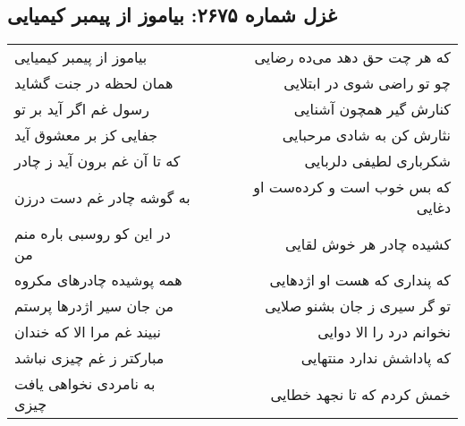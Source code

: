 \begin{center}
\section*{غزل شماره ۲۶۷۵: بیاموز از پیمبر کیمیایی}
\label{sec:2675}
\begin{longtable}{l p{0.5cm} r}
بیاموز از پیمبر کیمیایی
&&
که هر چت حق دهد می‌ده رضایی
\\
همان لحظه در جنت گشاید
&&
چو تو راضی شوی در ابتلایی
\\
رسول غم اگر آید بر تو
&&
کنارش گیر همچون آشنایی
\\
جفایی کز بر معشوق آید
&&
نثارش کن به شادی مرحبایی
\\
که تا آن غم برون آید ز چادر
&&
شکرباری لطیفی دلربایی
\\
به گوشه چادر غم دست درزن
&&
که بس خوب است و کرده‌ست او دغایی
\\
در این کو روسبی باره منم من
&&
کشیده چادر هر خوش لقایی
\\
همه پوشیده چادرهای مکروه
&&
که پنداری که هست او اژدهایی
\\
من جان سیر اژدرها پرستم
&&
تو گر سیری ز جان بشنو صلایی
\\
نبیند غم مرا الا که خندان
&&
نخوانم درد را الا دوایی
\\
مبارکتر ز غم چیزی نباشد
&&
که پاداشش ندارد منتهایی
\\
به نامردی نخواهی یافت چیزی
&&
خمش کردم که تا نجهد خطایی
\\
\end{longtable}
\end{center}
